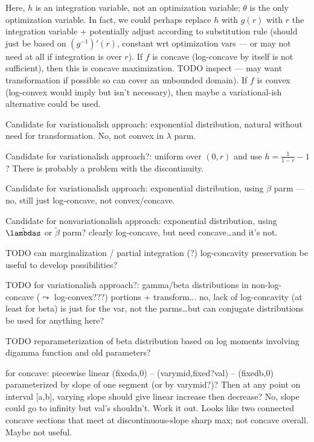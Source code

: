 \documentclass{article}
\begin{document}
\begin{itemize}
  Here, $h$ is an integration variable, not an optimization variable; $\theta$
  is the only optimization variable.
  In fact, we could perhaps replace $h$ with $g(r)$ with $r$ the integration
  variable + potentially adjust according to substitution rule (should just be
  based on $(g^{-1})'(r)$, constant wrt optimization vars --- or may not need at
  all if integration is over $r$).
  If $f$ is concave (log-concave by itself is not sufficient), then this is
  concave maximization. TODO inspect --- may want transformation if
  possible so can cover an unbounded domain).
  If $f$ is convex (log-convex would imply but isn't necessary), then maybe a
  variational-ish alternative could be used.

  Candidate for variationalish approach: exponential distribution, natural
  without need for transformation.  No, not convex in $\lambda$ parm. 

  Candidate for variationalish approach?: uniform over $(0,r)$ and use
  $h=\frac1{1-r}-1$?  There is probably a problem with the discontinuity.

  Candidate for variationalish approach: exponential distribution, using
  $\beta$ parm --- no, still just log-concave, not convex/concave.

  Candidate for nonvariationalish approach: exponential distribution, using
  $\tilde\lambdas$ or $\tilde\beta$ parm? clearly log-concave, but need
  concave\ldots and it's not.

  TODO can marginalization / partial integration (?) log-concavity preservation
  be useful to develop possibilities?

  TODO for variationalish approach?: gamma/beta distributions in non-log-concave
  ($\leadsto$ log-convex???) portions + transform... no, lack of log-concavity
  (at least for beta) is just for the var, not the parms\ldots but can conjugate
  distributions be used for anything here?

  TODO reparameterization of beta distribution based on log moments involving
  digamma function and old parameters?

  for concave: piecewise linear (fixeda,0) -- (varymid,fixed?val) -- (fixedb,0)
  parameterized by slope of one segment (or by varymid?)? Then at any point on
  interval [a,b], varying slope should give linear increase then decrease? No,
  slope could go to infinity but val's shouldn't. Work it out. Looks like two
  connected concave sections that meet at discontinuous-slope sharp max; not
  concave overall. Maybe not useful.


\end{itemize}
\end{document}
